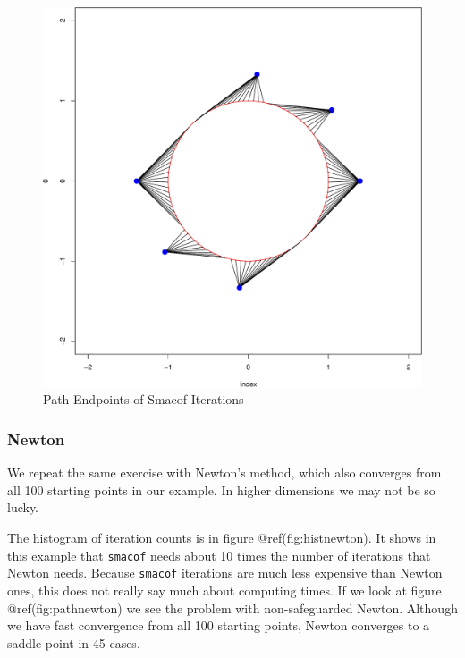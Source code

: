 \documentclass[
  12pt,
  letterpaper,
  DIV=11,
  numbers=noendperiod]{scrreprt}
\theoremstyle{remark}
\begin{document}
\begin{figure}[H]

{\centering \includegraphics{minimization_files/figure-pdf/pathsmacof-1.pdf}

}

\caption{Path Endpoints of Smacof Iterations}

\end{figure}%

\subsubsection{Newton}\label{attractnewton}

We repeat the same exercise with Newton's method, which also converges
from all 100 starting points in our example. In higher dimensions we may
not be so lucky.

The histogram of iteration counts is in figure @ref(fig:histnewton). It
shows in this example that \texttt{smacof} needs about 10 times the
number of iterations that Newton needs. Because \texttt{smacof}
iterations are much less expensive than Newton ones, this does not
really say much about computing times. If we look at figure
@ref(fig:pathnewton) we see the problem with non-safeguarded Newton.
Although we have fast convergence from all 100 starting points, Newton
converges to a saddle point in 45 cases.
\end{document}
